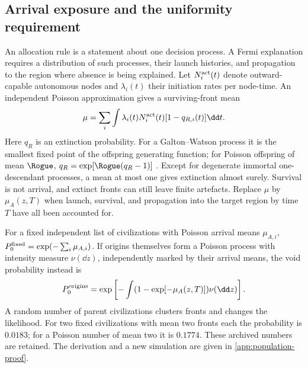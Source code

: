 \subsection{Arrival exposure and the uniformity requirement}
An allocation rule is a statement about one decision process. A Fermi
explanation requires a distribution of such processes, their launch
histories, and propagation to the region where absence is being explained.
Let $N_i^{\rm act}(t)$ denote outward-capable autonomous nodes and
$\lambda_i(t)$ their initiation rates per node-time. An independent
Poisson approximation gives a surviving-front mean
\begin{equation}
 \mu=\sum_i\int\lambda_i(t)N_i^{\rm act}(t)[1-q_{R,i}(t)]\dd t.
 \label{eq:mu}
\end{equation}
Here $q_R$ is an extinction probability. For a Galton--Watson process it
is the smallest fixed point of the offspring generating function; for
Poisson offspring of mean $\Rogue$,
$q_R=\exp[\Rogue(q_R-1)]$ \citep{Harris1963}. Except for degenerate
immortal one-descendant processes, a mean at most one gives extinction
almost surely. Survival is not arrival, and extinct fronts can still
leave finite artefacts. Replace $\mu$ by $\mu_A(z,T)$ when launch,
survival, and propagation into the target region by time $T$ have all
been accounted for.

For a fixed independent list of civilizations with Poisson arrival
means $\mu_{A,i}$, $P_0^{\rm fixed}=\exp(-\sum_i\mu_{A,i})$.
If origins themselves form a Poisson process with intensity measure
$\nu(\dd z)$, independently marked by their arrival means, the void
probability instead is
\begin{equation}
 P_0^{\rm origins}
 =\exp\left[-\int(1-\exp[-\mu_A(z,T)])\nu(\dd z)\right].
 \label{eq:origins}
\end{equation}
A random number of parent civilizations clusters fronts and changes the
likelihood. For two fixed civilizations with mean two fronts each the
probability is $0.0183$; for a Poisson number of mean two it is $0.1774$.
These archived numbers are retained. The derivation and a new simulation
are given in \cref{app:population-proof}.

